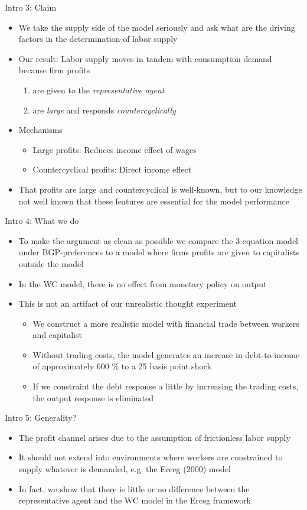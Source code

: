 \documentclass{beamer}
\newcommand{\bit}{\begin{itemize}}
\newcommand{\eit}{\end{itemize}}
\begin{document}
\begin{frame}{Intro 3: Claim}

\bit
	\item We take the supply side of the model seriously and ask what are the driving factors in the determination of labor supply
	\item Our result: Labor supply moves in tandem with consumption demand because firm profits
		\begin{enumerate}
		\item are given to the \emph{representative agent}
		\item are \emph{large} and responds \emph{countercyclically}
		\end{enumerate}
	\item Mechanisms
		\bit
			\item Large profits: Reduces income effect of wages
			\item Countercyclical profits: Direct income effect
		\eit
	\item That profits are large and countercyclical is well-known, but to our knowledge not well known that these features are essential for the model performance
\eit


\end{frame}


\begin{frame}{Intro 4: What we do}

\bit
	\item To make the argument as clean as possible we compare the 3-equation model under BGP-preferences to a model where firms profits are given to capitalists outside the model
	\item In the WC model, there is no effect from monetary policy on output
	\item This is not an artifact of our unrealistic thought experiment
		\bit
			\item We construct a more realistic model with financial trade between workers and capitalist
			\item Without trading costs, the model generates an increase in debt-to-income of approximately 600 \% to a 25 basis point shock
			\item If we constraint the debt response a little by increasing the trading costs, the output response is eliminated
		\eit	
\eit


\end{frame}



\begin{frame}{Intro 5: Generality?}

\bit
	\item The profit channel arises due to the assumption of frictionless labor supply
	\item It should not extend into environments where workers are constrained to supply whatever is demanded, e.g. the Erceg (2000) model
	\item In fact, we show that there is little or no difference between the representative agent and the WC model in the Erceg framework
\eit


\end{frame}
\end{document}
